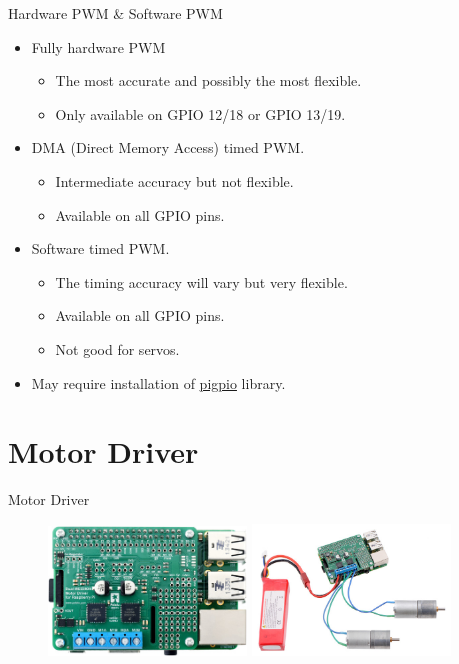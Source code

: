 \documentclass[12pt,letterpaper]{beamer}
\begin{document}
\begin{frame}{Hardware PWM \& Software PWM}
    \begin{itemize}
        \item Fully hardware PWM 
            \begin{itemize}
                \item The most accurate and possibly the most flexible.
                \item Only available on GPIO 12/18 or GPIO 13/19.
            \end{itemize}
        \item DMA (Direct Memory Access) timed PWM.
            \begin{itemize}
                \item Intermediate accuracy but not flexible.
                \item Available on all GPIO pins.
            \end{itemize}
        \item Software timed PWM.
            \begin{itemize}
                \item The timing accuracy will vary but very flexible.
                \item Available on all GPIO pins.
                \item Not good for servos.
            \end{itemize}
        \item May require installation of \href{https://abyz.me.uk/rpi/pigpio/}{pigpio} library.
    \end{itemize}
\end{frame}
    
\section{Motor Driver}

\begin{frame}{Motor Driver}
    \begin{figure}
        \includegraphics[width=0.47\textwidth]{driver_board}
        \includegraphics[width=0.47\textwidth]{driving_motors}
    \end{figure}
\end{frame}
\end{document}
